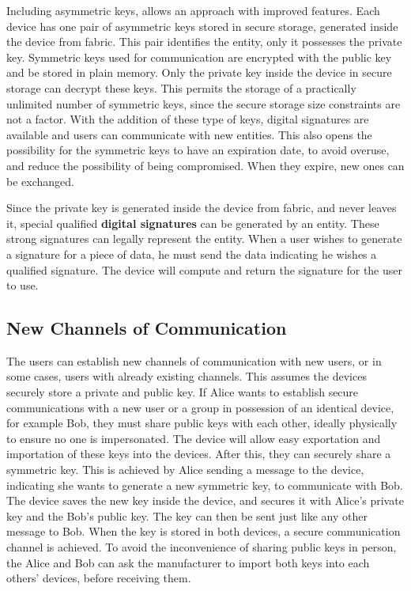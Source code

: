 Including asymmetric keys, allows an approach with improved features.
Each device has one pair of asymmetric keys stored in secure storage, generated inside the device from fabric. This pair identifies the entity, only it possesses the private key. Symmetric keys used for communication are encrypted with the public key and be stored in plain memory. Only the private key inside the device in secure storage can decrypt these keys. This permits the storage of a practically unlimited number of symmetric keys, since the secure storage size constraints are not a factor.
With the addition of these type of keys, digital signatures are available and users can communicate with new entities. This also opens the possibility for the symmetric keys to have an expiration date, to avoid overuse, and reduce the possibility of being compromised. When they expire, new ones can be exchanged.

Since the private key is generated inside the device from fabric, and never leaves it, special qualified \textbf{digital signatures} can be generated by an entity. These strong signatures can legally represent the entity. When a user wishes to generate a signature for a piece of data, he must send the data indicating he wishes a qualified signature. The device will compute and return the signature for the user to use.

\subsection{New Channels of Communication}\label{chap:problem:scenarios:keys}

The users can establish new channels of communication with new users, or in some cases, users with already existing channels. This assumes the devices securely store a private and public key.
If Alice wants to establish secure communications with a new user or a group in possession of an identical device, for example Bob, they must share public keys with each other, ideally physically to ensure no one is impersonated. The device will allow easy exportation and importation of these keys into the devices. After this, they can securely share a symmetric key. This is achieved by Alice sending a message to the device, indicating she wants to generate a new symmetric key, to communicate with Bob. The device saves the new key inside the device, and secures it with Alice's private key and the Bob's public key. The key can then be sent just like any other message to Bob. When the key is stored in both devices, a secure communication channel is achieved.
To avoid the inconvenience of sharing public keys in person, the Alice and Bob can ask the manufacturer to import both keys into each others' devices, before receiving them.

